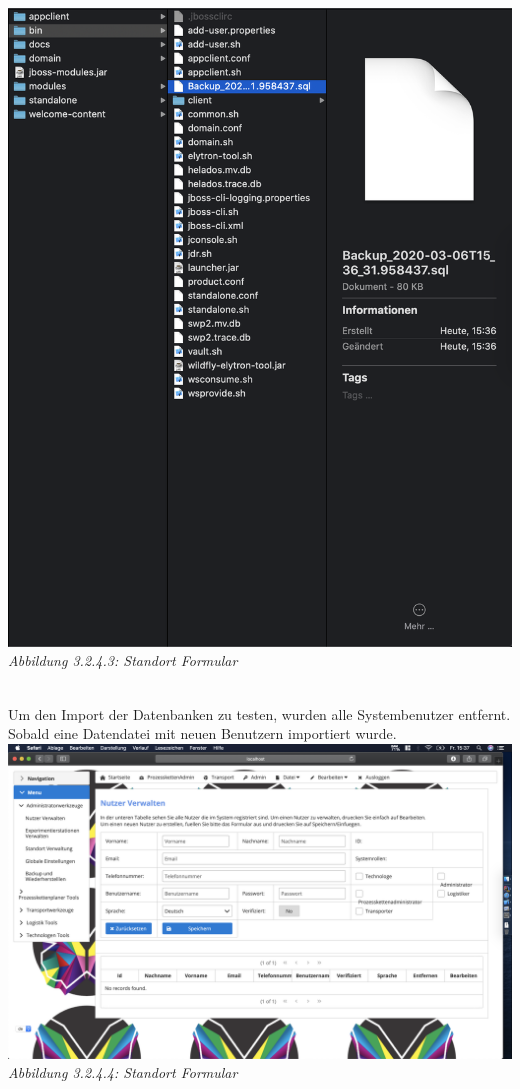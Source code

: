 \documentclass[enabledeprecatedfontcommands,fontsize=12pt,paper=a4,twoside]{scrartcl}
\begin{document}
\hypertarget{sc3.1.5.3}{
\includegraphics[width=1\textwidth]{Screenshots/5BackUpDatei.png}
\textit{Abbildung 3.2.4.3: Standort Formular}
} \\
Um den Import der Datenbanken zu testen, wurden alle Systembenutzer entfernt. Sobald eine Datendatei mit neuen Benutzern importiert wurde.\\
\hypertarget{sc3.1.5.4}{
\includegraphics[width=1\textwidth]{Screenshots/5NotUsers.png}
\textit{Abbildung 3.2.4.4: Standort Formular}
} \\
\end{document}
